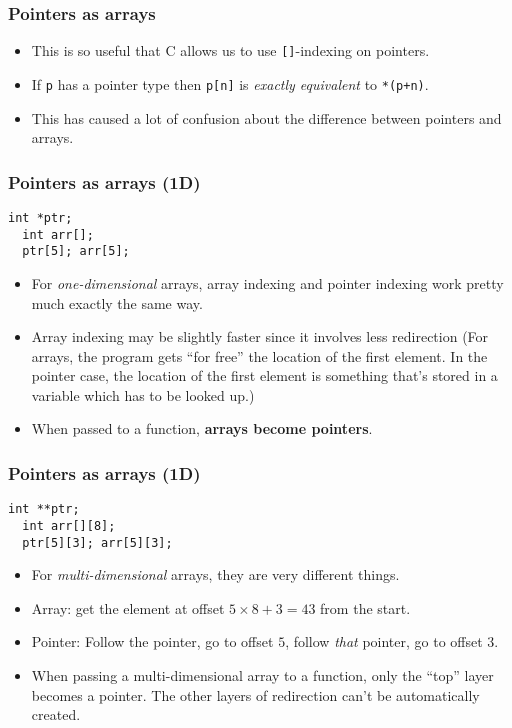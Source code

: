 \begin{frame}[fragile]
  \frametitle{Pointers as arrays}
  \begin{itemize}
  \item This is so useful that C allows us to use \texttt{[]}-indexing on
    pointers.
  \item If \texttt{p} has a pointer type then \texttt{p[n]} is
    \emph{exactly equivalent} to \texttt{*(p+n)}.
  \item This has caused a lot of confusion about the difference between pointers
    and arrays.
  \end{itemize}
\end{frame}

\begin{frame}[fragile]
  \frametitle{Pointers as arrays (1D)}
    \begin{lstlisting}[style=c]
  int *ptr;
  int arr[];
  ptr[5]; arr[5];
    \end{lstlisting}
  \begin{itemize}
  \item For \emph{one-dimensional} arrays, array indexing and pointer indexing
    work pretty much exactly the same way.
  \item Array indexing may be slightly faster since it involves less redirection
    (For arrays, the program gets ``for free'' the location of the first
    element. In the pointer case, the location of the first element is something
    that's stored in a variable which has to be looked up.)
  \item When passed to a function, \textbf{arrays become pointers}.
  \end{itemize}
\end{frame}

\begin{frame}[fragile]
  \frametitle{Pointers as arrays (1D)}
    \begin{lstlisting}[style=c]
  int **ptr;
  int arr[][8];
  ptr[5][3]; arr[5][3];
    \end{lstlisting}
  \begin{itemize}
  \item For \emph{multi-dimensional} arrays, they are very different things.
  \item Array: get the element at offset $5\times8 + 3 = 43$ from the start.
  \item Pointer: Follow the pointer, go to offset $5$, follow \emph{that}
    pointer, go to offset $3$.
  \item When passing a multi-dimensional array to a function, only the ``top''
    layer becomes a pointer. The other layers of redirection can't be
    automatically created.
  \end{itemize}
\end{frame}

